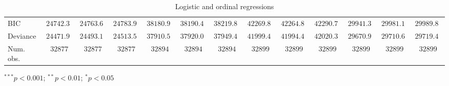 \begin{table}
\begin{center}
\begin{threeparttable}
\begin{tabular}{l c c c c c c c c c c c c}
BIC                             & $24742.39$    & $24763.61$    & $24783.96$    & $38180.98$    & $38190.45$    & $38219.86$    & $42269.84$    & $42264.87$    & $42290.75$    & $29941.33$    & $29981.11$    & $29989.89$    \\
Deviance                        & $24471.98$    & $24493.19$    & $24513.54$    & $37910.55$    & $37920.02$    & $37949.44$    & $41999.41$    & $41994.44$    & $42020.32$    & $29670.90$    & $29710.68$    & $29719.46$    \\
Num. obs.                       & $32877$       & $32877$       & $32877$       & $32894$       & $32894$       & $32894$       & $32899$       & $32899$       & $32899$       & $32899$       & $32899$       & $32899$       \\
\bottomrule
\end{tabular}
\begin{tablenotes}[flushleft]
\scriptsize{\item $^{***}p<0.001$; $^{**}p<0.01$; $^{*}p<0.05$}
\end{tablenotes}
\end{threeparttable}
\caption{Logistic and ordinal regressions}
\label{table:coefficients}
\end{center}
\end{table}
